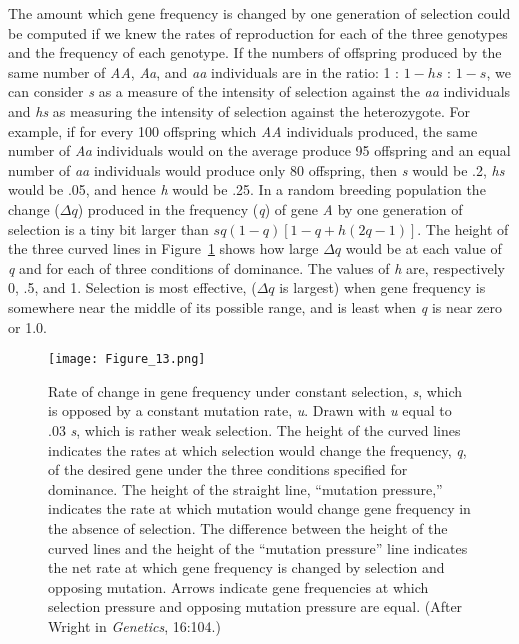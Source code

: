 The amount which gene frequency is changed by one generation of selection
could be computed if we knew the rates of reproduction for each of the
three genotypes and the frequency of each genotype. If the numbers of
offspring produced by the same number of \textit{AA}, \textit{Aa}, and
\textit{aa} individuals are in the ratio: 1 : $1 - hs$ : $1 - s$, we can
consider \textit{s} as a measure of the intensity of selection against the
\textit{aa} individuals and \textit{hs} as measuring the intensity of
selection against the heterozygote. For example, if for every 100 offspring
which \textit{AA} individuals produced, the same number of \textit{Aa}
individuals would on the average produce 95 offspring and an equal number of
\textit{aa} individuals would produce only 80 offspring, then \textit{s}
would be .2, \textit{hs} would be .05, and hence \textit{h} would be .25.
In a random breeding population the change ($\Delta q$) produced in the
frequency (\textit{q}) of gene \textit{A} by one generation of selection is
a tiny bit larger than $sq(1 - q)[1 - q + h(2q - 1)]$. The height of the
three curved lines in Figure~\ref{fig:Lush_Figure_13} shows how large
$\Delta q$ would be at each value of \textit{q} and for each of three
conditions of dominance. The values of \textit{h} are, respectively 0, .5,
and 1. Selection is most effective, ($\Delta q$ is largest) when gene
frequency is somewhere near the middle of its possible range, and is least
when \textit{q} is near zero or 1.0.

\begin{figure}
	\centering
    \texttt{[image: Figure\_13.png]}
    \caption{Rate of change in gene frequency under constant selection, \textit{s},
    		 which is opposed by a constant mutation rate, \textit{u}. Drawn with
    		 \textit{u} equal to .03 \textit{s}, which is rather weak selection.
    		 The height of the curved lines indicates the rates at which selection
			 would change the frequency, \textit{q}, of the desired gene under the
			 three conditions specified for dominance. The height of the straight line,
			 ``mutation pressure,'' indicates the rate at which mutation would change
			 gene frequency in the absence of selection. The difference between the
			 height of the curved lines and the height of the ``mutation pressure''
			 line indicates the net rate at which gene frequency is changed by selection
			 and opposing mutation. Arrows indicate gene frequencies at which selection
			 pressure and opposing mutation pressure are equal. (After Wright in
			 \textit{Genetics}, 16:104.)}
    \label{fig:Lush_Figure_13}
\end{figure}

